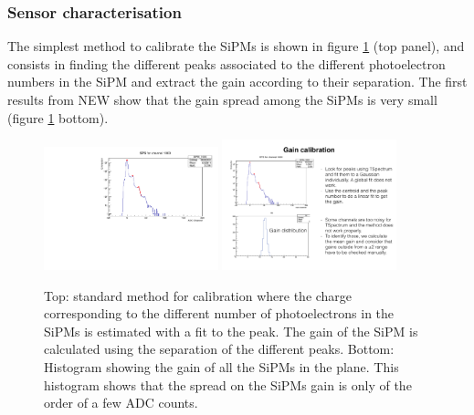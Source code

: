 \subsubsection*{Sensor characterisation}
The simplest method to calibrate the SiPMs is shown in figure \ref{fig:calibration} (top panel), and consists  in finding the different peaks associated to the different photoelectron numbers in the SiPM and extract the gain according to their separation. The first results from NEW show that the gain spread among the SiPMs is very small (figure \ref{fig:calibration} bottom).

\begin{figure}[hpt!]
\centering
\includegraphics[width=0.45\textwidth]{TrackingPlane/IMG/normal_calibration}
\includegraphics[width=0.45\textwidth]{TrackingPlane/IMG/SIPMsGain}
\caption{Top: standard method for calibration where the charge corresponding to the different number of photoelectrons in the SiPMs is estimated with a fit to the peak. The gain of the SiPM is calculated using the separation of the different peaks. Bottom: Histogram showing the gain of all the SiPMs in the plane. This histogram shows that the spread on the SiPMs gain is only of the order of a few ADC counts. 
}
\label{fig:calibration}
\end{figure}

